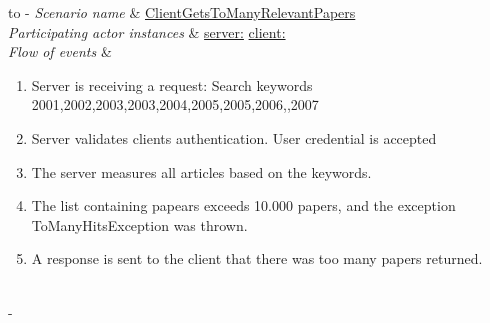\documentclass{article}
\begin{document}
%
%
\begin{table}[h!]
	\tabulinesep=1.5mm
	\begin{tabu} to 
		\tabucline[1.5pt]-
		\textit{Scenario name} & \underline{ClientGetsToManyRelevantPapers} \\
		\hline
		\textit{Participating actor \newline instances} & \underline{server:\serverside}
		\newline \underline{client:\clientside} \\
		\hline
		\textit{Flow of events} &
		\vspace{-3mm}
		\begin{enumerate}[leftmargin=*,topsep=0pt,itemsep=-1ex]
			\item Server is receiving a request: Search keywords {2001,2002,2003,2003,2004,2005,2005,2006,,2007}
						
			\item Server validates clients authentication. User credential is accepted
			
			\item The server measures all articles based on the keywords.
			
			\item The list containing papears exceeds 10.000 papers, and the exception ToManyHitsException was thrown.
			
			\item A response is sent to the client that there was too many papers returned.\\				
		\end{enumerate} \\
		\tabucline[1.5pt]-
	\end{tabu}
	\caption{Scenario when a user has requested to many papers during one request.}
	\label{sc:ClientGetsToManyRelevantPapers}
\end{table}
\end{document}
